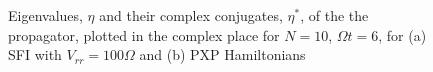 \begin{figure}
  \centering
  \caption{Eigenvalues, $\eta$ and their complex conjugates, $\eta^*$,
    of the the propagator, plotted in the complex place for $N=10$,
    $\Omega t=6$, for (a) SFI with $V_{rr}=100\Omega$ and (b) PXP
    Hamiltonians}
\end{figure}


